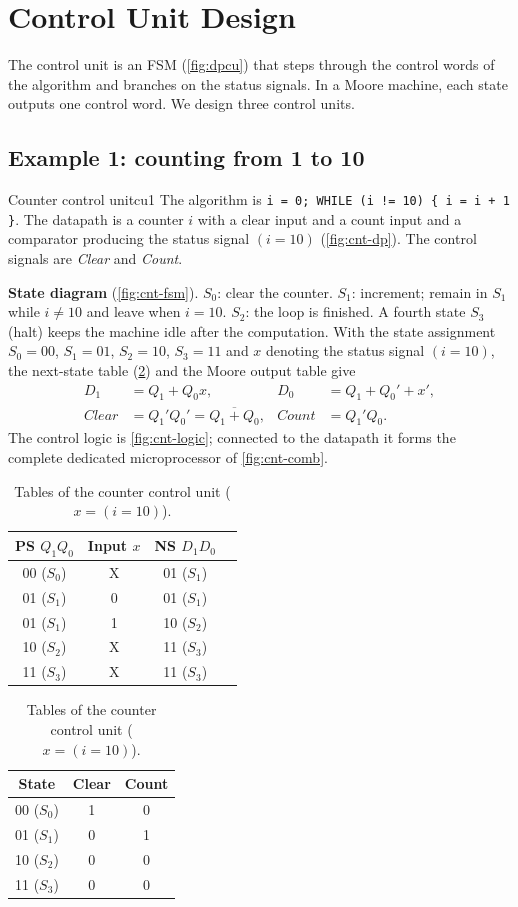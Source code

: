 \section{Control Unit Design}\label{sec:cu-design}
The control unit is an FSM (\cref{fig:dpcu}) that steps through the control words of the algorithm and branches on the status signals. In a Moore machine, each state outputs one control word. We design three control units.

\subsection{Example 1: counting from 1 to 10}
\begin{example}{Counter control unit}{cu1}
The algorithm is \texttt{i = 0; WHILE (i != 10) \{ i = i + 1 \}}. The datapath is a counter $i$ with a clear input and a count input and a comparator producing the status signal $(i=10)$ (\cref{fig:cnt-dp}). The control signals are \emph{Clear} and \emph{Count}.

\textbf{State diagram} (\cref{fig:cnt-fsm}). $S_0$: clear the counter. $S_1$: increment; remain in $S_1$ while $i\neq10$ and leave when $i=10$. $S_2$: the loop is finished. A fourth state $S_3$ (halt) keeps the machine idle after the computation. With the state assignment $S_0=00$, $S_1=01$, $S_2=10$, $S_3=11$ and $x$ denoting the status signal $(i=10)$, the next-state table (\cref{tab:cu1}) and the Moore output table give
\begin{align*}
 D_1 &= Q_1 + Q_0x, & D_0 &= Q_1 + Q_0' + x',\\
 Clear &= Q_1'Q_0' = \overline{Q_1+Q_0}, & Count &= Q_1'Q_0 .
\end{align*}
The control logic is \cref{fig:cnt-logic}; connected to the datapath it forms the complete dedicated microprocessor of \cref{fig:cnt-comb}.
\end{example}

\begin{table}[htbp]
\centering
\caption{Tables of the counter control unit ($x=(i=10)$).}
\label{tab:cu1}
\begin{tabular}{cc|cc}
\toprule PS $Q_1Q_0$ & Input $x$ & NS $D_1D_0$ & \\ \midrule
00 ($S_0$)&X&01 ($S_1$)&\\ 01 ($S_1$)&0&01 ($S_1$)&\\ 01 ($S_1$)&1&10 ($S_2$)&\\
10 ($S_2$)&X&11 ($S_3$)&\\ 11 ($S_3$)&X&11 ($S_3$)&\\ \bottomrule
\end{tabular}\qquad
\begin{tabular}{c|cc}
\toprule State & Clear & Count\\ \midrule
00 ($S_0$)&1&0\\01 ($S_1$)&0&1\\10 ($S_2$)&0&0\\11 ($S_3$)&0&0\\ \bottomrule
\end{tabular}
\end{table}

